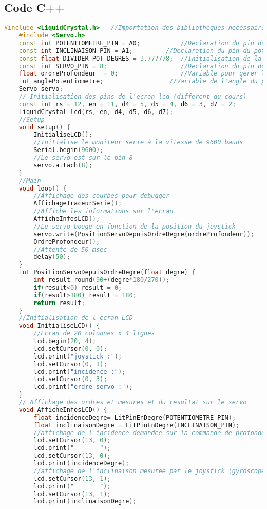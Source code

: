 \documentclass[a4paper, 9pt]{article}
\begin{document}
\subsection{Code C++}
\begin{lstlisting}[language=c++]
	#include <LiquidCrystal.h>   //Importation des bibliotheques necessaires au code
	#include <Servo.h>
	const int POTENTIOMETRE_PIN = A0;           //Declaration du pin du potentiometre/joystick
	const int INCLINAISON_PIN = A1;         //Declaration du pin du potentiometre/gyroscope 
	const float DIVIDER_POT_DEGRES = 3.777778;  //Initialisation de la valeur pour la convertion de la valeur potentiometre en degree
	const int SERVO_PIN = 8;                    //Declaration du pin du servomoteur
	float ordreProfondeur  = 0;                 //Variable pour gerer l'angle du servomoteur
	int anglePotentiometre;                  //Variable de l'angle du potentiometre
	Servo servo;
	// Initialisation des pins de l'ecran lcd (different du cours)
	const int rs = 12, en = 11, d4 = 5, d5 = 4, d6 = 3, d7 = 2;
	LiquidCrystal lcd(rs, en, d4, d5, d6, d7);
	//Setup
	void setup() {	
		InitialiseLCD();	
		//Initialise le moniteur serie à la vitesse de 9600 bauds
		Serial.begin(9600);
		//Le servo est sur le pin 8
		servo.attach(8);
	}
	//Main
	void loop() {
		//Affichage des courbes pour debugger
		AffichageTraceurSerie();
		//Affiche les informations sur l'ecran
		AfficheInfosLCD();
		//Le servo bouge en fonction de la position du joystick
		servo.write(PositionServoDepuisOrdreDegre(ordreProfondeur));
		OrdreProfondeur();
		//Attente de 50 msec
		delay(50);
	}
	int PositionServoDepuisOrdreDegre(float degre) {
		int result round(90+(degre*180/270));
		if(result<0) result = 0;
		if(result>180) result = 180;
		return result;	
	}
	//Initialisation de l'ecran LCD
	void InitialiseLCD() {	
		//Ecran de 20 colonnes x 4 lignes
		lcd.begin(20, 4);
		lcd.setCursor(0, 0);
		lcd.print("joystick :");
		lcd.setCursor(0, 1);
		lcd.print("incidence :");
		lcd.setCursor(0, 3);
		lcd.print("ordre servo :");
	}
	// Affichage des ordres et mesures et du resultat sur le servo
	void AfficheInfosLCD() {
		float incidenceDegre= LitPinEnDegre(POTENTIOMETRE_PIN);
		float inclinaisonDegre = LitPinEnDegre(INCLINAISON_PIN);
		//affichage de l'incidence demandee sur la commande de profondeur
		lcd.setCursor(13, 0);
		lcd.print("       ");
		lcd.setCursor(13, 0);
		lcd.print(incidenceDegre);
		//affichage de l'inclinaison mesuree par le joystick (gyroscope)
		lcd.setCursor(13, 1);
		lcd.print("       ");
		lcd.setCursor(13, 1);
		lcd.print(inclinaisonDegre);

\end{lstlisting}
\end{document}
